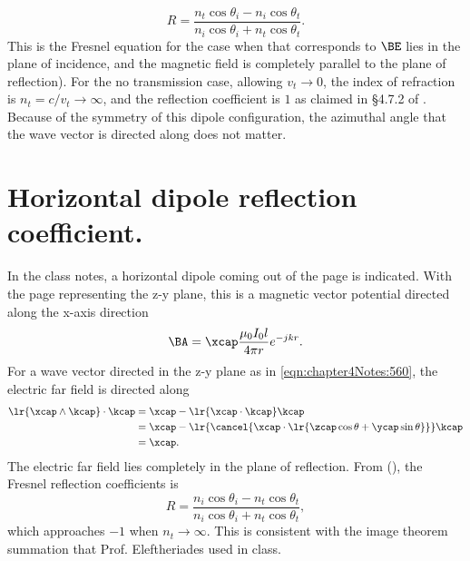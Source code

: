 %
\begin{equation}\label{eqn:chapter4Notes:620}
R
=
\frac{
n_t \cos\theta_i - n_i \cos\theta_t
}
{
n_i \cos\theta_i + n_t \cos\theta_t
}.
\end{equation}
%
This is the Fresnel equation for the case when
that corresponds to
\( \BE \) lies in the plane of incidence, and the magnetic field is completely parallel to the plane of reflection).  For the no transmission case, allowing \( v_t \rightarrow 0 \), the index of refraction is \( n_t = c/v_t \rightarrow \infty \), and the reflection coefficient is \( 1 \) as claimed in \S 4.7.2 of \citep{balanis2005antenna}.  Because of the symmetry of this dipole configuration, the azimuthal angle that the wave vector is directed along does not matter.
%
\section{Horizontal dipole reflection coefficient.}
%
In the class notes, a horizontal dipole coming out of the page is indicated.  With the page representing the z-y plane, this is a magnetic vector potential directed along the x-axis direction
%
\begin{equation}\label{eqn:chapter4Notes:640}
\BA = \xcap \frac{\mu_0 I_0 l}{4 \pi r} e^{-j k r}.
\end{equation}
%
For a wave vector directed in the z-y plane as in \cref{eqn:chapter4Notes:560}, the electric far field is directed along
%
\begin{equation}\label{eqn:chapter4Notes:660}
\begin{aligned}
\lr{ \xcap \wedge \kcap } \cdot \kcap
&=
\xcap - \lr{ \xcap \cdot \kcap } \kcap
\\ &=
\xcap - \lr{ \cancel{\xcap \cdot \lr{
\zcap \cos\theta + \ycap \sin\theta
}} } \kcap
\\ &= \xcap.
\end{aligned}
\end{equation}
%
The electric far field lies completely in the plane of reflection.  From \citep{hecht1998hecht} (), the Fresnel reflection coefficients is
%
\begin{equation}\label{eqn:chapter4Notes:680}
R =
\frac{
n_i \cos\theta_i - n_t \cos\theta_t
}
{
n_i \cos\theta_i + n_t \cos\theta_t
},
\end{equation}
%
which approaches \( -1 \) when \( n_t \rightarrow \infty \).  This is consistent with the image theorem summation that Prof. Eleftheriades used in class.
%
